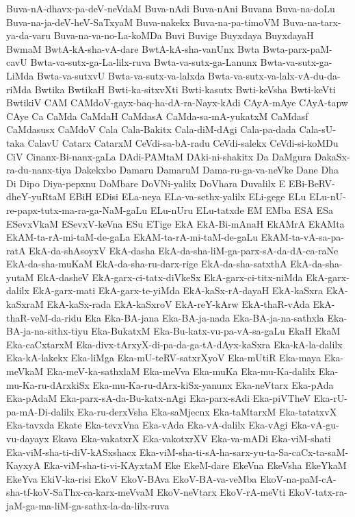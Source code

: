 {Buva-nA-dhavx-pa-deV-neVdaM
Buva-nAdi
Buva-nAni
Buvana
Buva-na-doLu
Buva-na-ja-deV-heV-SaTxyaM
Buva-nakekx
Buva-na-pa-timoVM
Buva-na-tarx-ya-da-varu
Buva-na-va-no-La-koMDa
Buvi
Buvige
Buyxdaya
BuyxdayaH
BwmaM
BwtA-kA-sha-vA-dare
BwtA-kA-sha-vanUnx
Bwta
Bwta-parx-paM-cavU
Bwta-va-sutx-ga-La-lilx-ruva
Bwta-va-sutx-ga-Lanunx
Bwta-va-sutx-ga-LiMda
Bwta-va-sutxvU
Bwta-va-sutx-va-lalxda
Bwta-va-sutx-va-lalx-vA-du-da-riMda
Bwtika
BwtikaH
Bwti-ka-sitxvXti
Bwti-kasutx
Bwti-keVsha
Bwti-keVti
BwtikiV
CAM
CAMdoV-gayx-baq-ha-dA-ra-Nayx-kAdi
CAyA-mAye
CAyA-tapw
CAye
Ca
CaMda
CaMdaH
CaMdasA
CaMda-sa-mA-yukatxM
CaMdasf
CaMdasusx
CaMdoV
Cala
Cala-Bakitx
Cala-diM-dAgi
Cala-pa-dada
Cala-sU-taka
CalavU
Catarx
CatarxM
CeVdi-sa-bA-radu
CeVdi-salekx
CeVdi-si-koMDu
CiV
Cinanx-Bi-nanx-gaLa
DAdi-PAMtaM
DAki-ni-shakitx
Da
DaMgura
DakaSx-ra-du-nanx-tiya
Dakekxbo
Damaru
DamaruM
Dama-ru-ga-va-neVke
Dane
Dha
Di
Dipo
Diya-pepxnu
DoMbare
DoVNi-yalilx
DoVhara
Duvalilx
E
EBi-BeRV-dheY-yuRtaM
EBiH
EDisi
ELa-neya
ELa-va-sethx-yalilx
ELi-gege
ELu
ELu-nU-re-papx-tutx-ma-ra-ga-NaM-gaLu
ELu-nUru
ELu-tatxde
EM
EMba
ESA
ESa
ESevxVkaM
ESevxV-keVna
ESu
ETige
EkA
EkA-Bi-mAnaH
EkAMrA
EkAMta
EkAM-ta-rA-mi-taM-de-gaLa
EkAM-ta-rA-mi-taM-de-gaLu
EkAM-ta-vA-sa-pa-ratA
EkA-da-shAsoyxV
EkA-dasha
EkA-da-sha-liM-ga-parx-sA-da-dA-ca-raNe
EkA-da-sha-muKaM
EkA-da-sha-ru-darx-rige
EkA-da-sha-satxthA
EkA-da-sha-yutaM
EkA-dasheV
EkA-garx-ci-tatx-diVkeSx
EkA-garx-ci-titx-niMda
EkA-garx-dalilx
EkA-garx-mati
EkA-garx-te-yiMda
EkA-kaSx-rA-dayaH
EkA-kaSxra
EkA-kaSxraM
EkA-kaSx-rada
EkA-kaSxroV
EkA-reY-kArw
EkA-thaR-vAda
EkA-thaR-veM-da-ridu
Eka
Eka-BA-jana
Eka-BA-ja-nada
Eka-BA-ja-na-sathxla
Eka-BA-ja-na-sithx-tiyu
Eka-BukatxM
Eka-Bu-katx-vu-pa-vA-sa-gaLu
EkaH
EkaM
Eka-caCxtarxM
Eka-divx-tArxyX-di-pa-da-ga-tA-dAyx-kaSxra
Eka-kA-la-dalilx
Eka-kA-lakekx
Eka-liMga
Eka-mU-teRV-satxrXyoV
Eka-mUtiR
Eka-maya
Eka-meVkaM
Eka-meV-ka-sathxlaM
Eka-meVva
Eka-muKa
Eka-mu-Ka-dalilx
Eka-mu-Ka-ru-dArxkiSx
Eka-mu-Ka-ru-dArx-kiSx-yanunx
Eka-neVtarx
Eka-pAda
Eka-pAdaM
Eka-parx-sA-da-Bu-katx-nAgi
Eka-parx-sAdi
Eka-piVTheV
Eka-rU-pa-mA-Di-dalilx
Eka-ru-derxVsha
Eka-saMjecnx
Eka-taMtarxM
Eka-tatatxvX
Eka-tavxda
Ekate
Eka-tevxVna
Eka-vAda
Eka-vA-dalilx
Eka-vAgi
Eka-vA-gu-vu-dayayx
Ekava
Eka-vakatxrX
Eka-vakotxrXV
Eka-va-mADi
Eka-viM-shati
Eka-viM-sha-ti-diV-kASxshacx
Eka-viM-sha-ti-sA-ha-sarx-yu-ta-Sa-caCx-ta-saM-KayxyA
Eka-viM-sha-ti-vi-KAyxtaM
Eke
EkeM-dare
EkeVna
EkeVsha
EkeYkaM
EkeYva
EkiV-ka-risi
EkoV
EkoV-BAva
EkoV-BA-va-veMba
EkoV-na-paM-cA-sha-tf-koV-SaThx-ca-karx-meVvaM
EkoV-neVtarx
EkoV-rA-meVti
EkoV-tatx-ra-jaM-ga-ma-liM-ga-sathx-la-da-lilx-ruva
}
